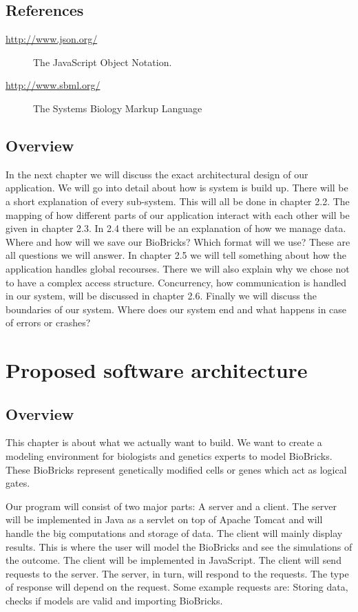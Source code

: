\documentclass[a4paper]{article}
\begin{document}
\subsection{References}
\begin{description}
	\item[\url{http://www.json.org/}] The JavaScript Object Notation.
	\item[\url{http://www.sbml.org/}] The Systems Biology Markup Language
\end{description}

\subsection{Overview}
In the next chapter we will discuss the exact architectural design of our application. We will go into detail about how is system is build up. There will be a short explanation of every sub-system. This will all be done in chapter 2.2. The mapping of how different parts of our application interact with each other will be given in chapter 2.3. In 2.4 there will be an explanation of how we manage data. Where and how will we save our BioBricks? Which format will we use? These are all questions we will answer. In chapter 2.5 we will tell something about how the application handles global recourses. There we will also explain why we chose not to have a complex access structure. Concurrency, how communication is handled in our system, will be discussed in chapter 2.6. Finally we will discuss the boundaries of our system. Where does our system end and what happens in case of errors or crashes? 

\section{Proposed software architecture}
\subsection{Overview}
This chapter is about what we actually want to build. We want to create a modeling environment for biologists and genetics experts to model BioBricks. These BioBricks represent genetically modified cells or genes which act as logical gates. 


Our program will consist of two major parts: A server and a client. The server will be implemented in Java as a servlet on top of Apache Tomcat and will handle the big computations and storage of data. The client will mainly display results. This is where the user will model the BioBricks and see the simulations of the outcome. The client will be implemented in JavaScript. The client will send requests to the server. The server, in turn, will respond to the requests. The type of response will depend on the request. Some example requests are: Storing data, checks if models are valid and importing BioBricks. 
\end{document}
